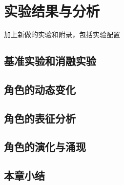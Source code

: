 
\chapter{实验结果与分析}
加上新做的实验和附录，包括实验配置

\section{基准实验和消融实验}

\section{角色的动态变化}

\section{角色的表征分析}

\section{角色的演化与涌现}

\section{本章小结}

